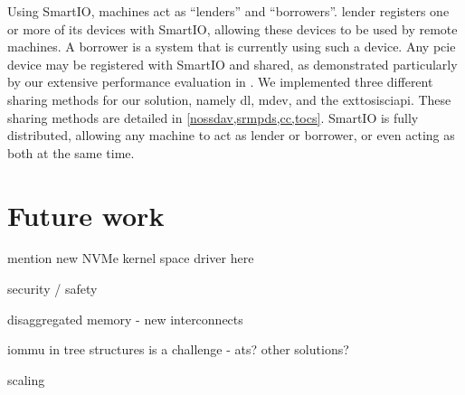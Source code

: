 


\objdistributed*%
%
Using SmartIO, machines act as ``\glspl{lender}'' and ``\glspl{borrower}''. 
%
\Gls{lender} registers one or more of its devices with SmartIO, allowing these devices to be used by remote machines.
%
A \gls{borrower} is a system that is currently using such a device.
%
Any \gls{pcie} device may be registered with SmartIO and shared, as demonstrated particularly by our extensive performance evaluation in .
%
We implemented three different sharing methods for our solution, namely \gls{dl}, \gls{mdev}, and the \gls{exttosisciapi}.
%
These sharing methods are detailed in \cref{nossdav,srmpds,cc,tocs}.
%
SmartIO is fully distributed, allowing any machine to act as \gls{lender} or \gls{borrower}, or even acting as both at the same time.



\objtransparent*%
%












\section{Future work}\label{sec:fw}

mention new NVMe kernel space driver here

security / safety

disaggregated memory - new interconnects

iommu in tree structures is a challenge - ats? other solutions?


scaling



